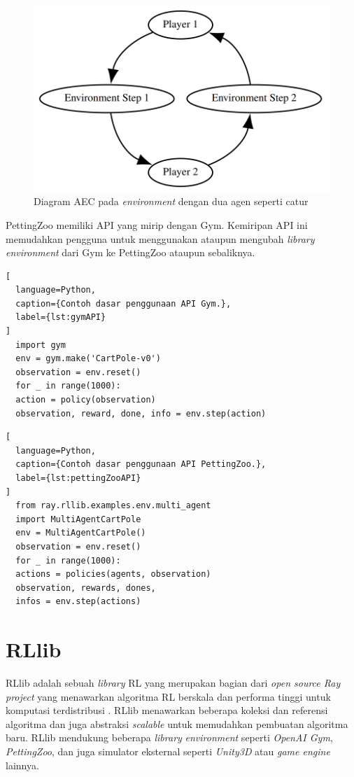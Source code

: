 \begin{figure}[H]
  \centering
    \includegraphics[scale=0.5]{gambar/actor_environment_cycle.png}
    \caption{Diagram AEC pada \emph{environment} dengan dua agen seperti catur}
    \label{fig:actorEnvironmentCycle}
\end{figure}

PettingZoo memiliki API yang mirip dengan Gym. Kemiripan API ini memudahkan pengguna untuk menggunakan ataupun mengubah \emph{library environment} dari Gym ke PettingZoo ataupun sebaliknya.

\begin{lstlisting}[
  language=Python,
  caption={Contoh dasar penggunaan API Gym.},
  label={lst:gymAPI}
]
  import gym
  env = gym.make('CartPole-v0')
  observation = env.reset()
  for _ in range(1000):
  action = policy(observation)
  observation, reward, done, info = env.step(action)
\end{lstlisting}

\begin{lstlisting}[
  language=Python,
  caption={Contoh dasar penggunaan API PettingZoo.},
  label={lst:pettingZooAPI}
]
  from ray.rllib.examples.env.multi_agent
  import MultiAgentCartPole
  env = MultiAgentCartPole()
  observation = env.reset()
  for _ in range(1000):
  actions = policies(agents, observation)
  observation, rewards, dones,
  infos = env.step(actions)
\end{lstlisting}

\section{RLlib}
RLlib adalah sebuah \emph{library} RL yang merupakan bagian dari \emph{open source Ray project} yang menawarkan
algoritma RL berskala dan performa tinggi untuk komputasi terdistribusi \citep{rllib}.
RLlib menawarkan beberapa koleksi dan referensi algoritma dan juga abstraksi \emph{scalable} untuk memudahkan
pembuatan algoritma baru. RLlib mendukung beberapa \emph{library} \emph{environment} seperti \emph{OpenAI Gym},
\emph{PettingZoo}, dan juga simulator eksternal seperti \emph{Unity3D} atau \emph{game engine} lainnya.